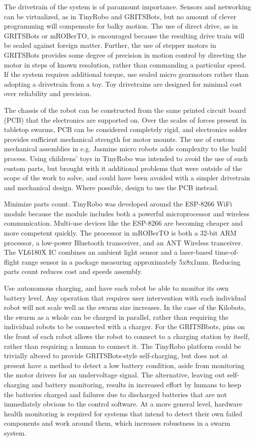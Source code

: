 \documentclass[]{article}
\begin{document}
The drivetrain of the system is of paramount importance. 
Sensors and networking can be virtualized, as in TinyRobo and GRITSBots, but no amount of clever programming will compensate for balky motion. 
The use of direct drive, as in GRITSBots or mROBerTO, is encouraged because the resulting drive train will be sealed against foreign matter. 
Further, the use of stepper motors in GRITSBots provides some degree of precision in motion control by directing the motor in steps of known resolution, rather than commanding a particular speed. 
If the system requires additional torque, use sealed micro gearmotors rather than adopting a drivetrain from a toy. 
Toy drivetrains are designed for minimal cost over reliability and precision. 

The chassis of the robot can be constructed from the same printed circuit board (PCB) that the electronics are supported on. 
Over the scales of forces present in tabletop swarms, PCB can be considered completely rigid, and electronics solder provides sufficient mechanical strength for motor mounts. 
The use of custom mechanical assemblies in e.g. Jasmine micro robots adds complexity to the build process. 
Using childrens' toys in TinyRobo was intended to avoid the use of such custom parts, but brought with it additional problems that were outside of the scope of the work to solve, and could have been avoided with a simpler drivetrain and mechanical design. 
Where possible, design to use the PCB instead. 

Minimize parts count. 
TinyRobo was developed around the ESP-8266 WiFi module because the module includes both a powerful microprocessor and wireless communication. 
Multi-use devices like the ESP-8266 are becoming cheaper and more competent quickly.
The processor in mROBerTO is both a 32-bit ARM processor, a low-power Bluetooth transceiver, and an ANT Wireless tranceiver. 
The VL6180X IC combines an ambient light sensor and a laser-based time-of-flight range sensor in a package measuring approximately 5x8x1mm. 
Reducing parts count reduces cost and speeds assembly. 

Use autonomous charging, and have each robot be able to monitor its own battery level. 
Any operation that requires user intervention with each individual robot will not scale well as the swarm size increases. 
In the case of the Kilobots, the swarm as a whole can be charged in parallel, rather than requiring the individual robots to be connected with a charger. 
For the GRITSBbots, pins on the front of each robot allows the robot to connect to a charging station by itself, rather than requiring a human to connect it. 
The TinyRobo platform could be trivially altered to provide GRITSBots-style self-charging, but does not at present have a method to detect a low battery condition, aside from monitoring the motor drivers for an undervoltage signal. 
The alternative, leaving out self-charging and battery monitoring, results in increased effort by humans to keep the batteries charged and failures due to discharged batteries that are not immediately obvious to the control software. 
At a more general level, hardware health monitoring is required for systems that intend to detect their own failed components and work around them, which increases robustness in a swarm system. 
\end{document}
